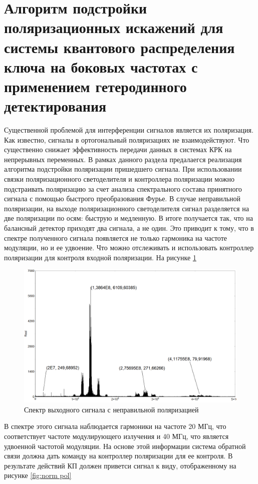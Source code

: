 \section{Алгоритм подстройки поляризационных искажений для системы квантового распределения ключа на боковых частотах с применением гетеродинного детектирования}\label{sec:ch3/sect4}
Существенной проблемой для интерференции сигналов является их поляризация. Как известно, сигналы в ортогональный поляризациях не взаимодействуют. Что существенно снижает эффективность передачи данных в системах КРК на непрерывных переменных. В рамках данного раздела предалаегся реализация алгоритма подстройки поляризации пришедшего сигнала.
При использовании связки поляризационного светоделителя и контроллера поляризации можно подстраивать поляризацию за счет анализа спектрального состава принятного сигнала с помощью быстрого преобразования Фурье. В случае неправильной поляризации, на выходе поляризационного светоделителя сигнал разделяется на две поляризации по осям: быструю и медленную. В итоге получается так, что на балансный детектор приходят два сигнала, а не один. Это приводит к тому, что в спектре полученного сигнала появляется не только гармоника на частоте модуляции, но и ее удвоение. Что можно отслеживать и использовать контроллер поляризации для контроля входной поляризации. На рисунке \ref{fig:ruin pol}
\begin{figure}
    \centering
    \includegraphics[width = \textwidth]{images/Spectrum of ruined polarization.png}
    \caption{Спектр выходного сигнала с неправильной поляризацией }
    \label{fig:ruin pol}
\end{figure}
В спектре этого сигнала наблюдается гармоники на частоте 20 МГц, что соответствует частоте модулирующего излучения и 40 МГц, что является удвоенной частотой модуляции. На основе этой информации система обратной связи должна дать команду на контроллер поляризации для ее контроля. В результате действий КП должен приветси сигнал к виду, отображенному на рисунке \ref{fig:norm pol}
